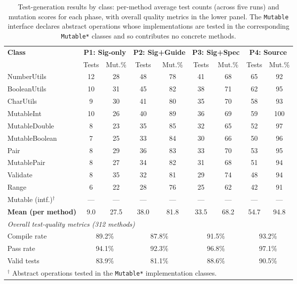 \begin{table}[t]
\centering
\caption{Test-generation results by class: per-method average test counts (across
five runs) and mutation scores for each phase, with overall quality metrics in the
lower panel. The \texttt{Mutable} interface declares abstract operations whose
implementations are tested in the corresponding \texttt{Mutable*} classes and so
contributes no concrete methods.}
\label{tab:art1:test-results}
\small
\begin{tabular}{l cc cc cc cc}
\toprule
\multirow{2}{*}{\textbf{Class}} &
\multicolumn{2}{c}{\textbf{P1: Sig-only}} &
\multicolumn{2}{c}{\textbf{P2: Sig+Guide}} &
\multicolumn{2}{c}{\textbf{P3: Sig+Spec}} &
\multicolumn{2}{c}{\textbf{P4: Source}} \\
\cmidrule(lr){2-3}\cmidrule(lr){4-5}\cmidrule(lr){6-7}\cmidrule(lr){8-9}
 & Tests & Mut.\% & Tests & Mut.\% & Tests & Mut.\% & Tests & Mut.\% \\
\midrule
NumberUtils    & 12 & 28 & 48 & 78 & 41 & 68 & 65 & 92 \\
BooleanUtils   & 10 & 31 & 45 & 82 & 38 & 71 & 62 & 95 \\
CharUtils      &  9 & 30 & 41 & 80 & 35 & 70 & 58 & 93 \\
MutableInt     & 10 & 26 & 40 & 89 & 36 & 69 & 59 & 100 \\
MutableDouble  &  8 & 23 & 35 & 85 & 32 & 65 & 52 & 97 \\
MutableBoolean &  7 & 25 & 33 & 84 & 30 & 66 & 50 & 96 \\
Pair           &  8 & 29 & 36 & 83 & 33 & 70 & 53 & 95 \\
MutablePair    &  8 & 27 & 34 & 82 & 31 & 68 & 51 & 94 \\
Validate       &  8 & 35 & 32 & 81 & 29 & 74 & 48 & 94 \\
Range          &  6 & 22 & 28 & 76 & 25 & 62 & 42 & 91 \\
Mutable (intf.)$^{\dagger}$ & --- & --- & --- & --- & --- & --- & --- & --- \\
\midrule
\textbf{Mean (per method)} & 9.0 & 27.5 & 38.0 & 81.8 & 33.5 & 68.2 & 54.7 & 94.8 \\
\midrule
\multicolumn{9}{l}{\textit{Overall test-quality metrics (312 methods)}} \\
\midrule
Compile rate & \multicolumn{2}{c}{89.2\%} & \multicolumn{2}{c}{87.8\%} & \multicolumn{2}{c}{91.5\%} & \multicolumn{2}{c}{93.2\%} \\
Pass rate    & \multicolumn{2}{c}{94.1\%} & \multicolumn{2}{c}{92.3\%} & \multicolumn{2}{c}{96.8\%} & \multicolumn{2}{c}{97.1\%} \\
Valid tests  & \multicolumn{2}{c}{83.9\%} & \multicolumn{2}{c}{81.1\%} & \multicolumn{2}{c}{88.6\%} & \multicolumn{2}{c}{90.5\%} \\
\bottomrule
\multicolumn{9}{l}{\footnotesize $^{\dagger}$ Abstract operations tested in the \texttt{Mutable*} implementation classes.}
\end{tabular}
\end{table}

